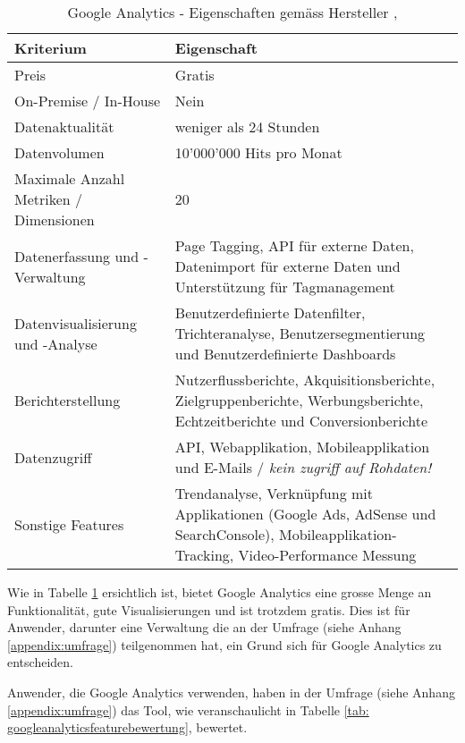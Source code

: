 \begin{table}[h]
	\centering
	\begin{tabular}{ | p{4cm} | p{10cm} |}
		\hline
		\textbf{Kriterium} & \textbf{Eigenschaft}  \\ 
		\hline
		Preis & Gratis \\
    \hline
    On-Premise / In-House & Nein \\
    \hline
    Datenaktualität & weniger als 24 Stunden \\
    \hline
    Datenvolumen & 10'000'000 Hits pro Monat\\
    \hline
    Maximale Anzahl Metriken / Dimensionen & 20\\
    \hline
    Datenerfassung und -Verwaltung &  Page Tagging, API für externe Daten, Datenimport für externe Daten und Unterstützung für Tagmanagement\\
    \hline
    Datenvisualisierung und -Analyse & Benutzerdefinierte Datenfilter, Trichteranalyse, Benutzersegmentierung und Benutzerdefinierte Dashboards\\
    \hline
    Berichterstellung & Nutzerflussberichte, Akquisitionsberichte, Zielgruppenberichte, Werbungsberichte, Echtzeitberichte und Conversionberichte \\
    \hline
    Datenzugriff & API, Webapplikation, Mobileapplikation und E-Mails / \textit{kein zugriff auf Rohdaten!}\\
    \hline
    Sonstige Features & Trendanalyse, Verknüpfung mit Applikationen (Google Ads, AdSense und SearchConsole), Mobileapplikation-Tracking, Video-Performance Messung\\
		\hline  
	\end{tabular}
	\caption{Google Analytics - Eigenschaften gemäss Hersteller \parencite {GoogleAnalyticsCompare}, \parencite{GoogleAnalyticsFeatures}}
	\label{tab: googleAnalyticsFeatures}
\end{table}

Wie in Tabelle \ref{tab: googleAnalyticsFeatures} ersichtlich ist, bietet Google Analytics eine grosse Menge an Funktionalität, gute Visualisierungen und ist trotzdem gratis. Dies ist für Anwender, darunter eine Verwaltung die an der Umfrage (siehe Anhang \ref{appendix:umfrage}) teilgenommen hat, ein Grund sich für Google Analytics zu entscheiden. 

Anwender, die Google Analytics verwenden, haben in der Umfrage (siehe Anhang \ref{appendix:umfrage}) das Tool, wie veranschaulicht in Tabelle \ref{tab: googleanalyticsfeaturebewertung}, bewertet.

